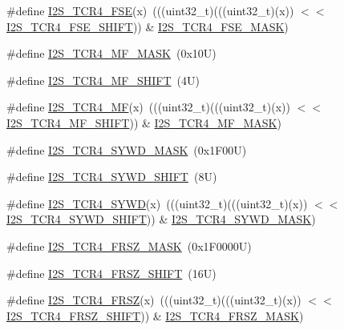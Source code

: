 \begin{DoxyCompactItemize}
\#define \mbox{\hyperlink{group___i2_s___register___masks_ga6307c965fa00d0cca8684a24ed16384c}{I2\+S\+\_\+\+T\+C\+R4\+\_\+\+F\+SE}}(x)~(((uint32\+\_\+t)(((uint32\+\_\+t)(x)) $<$$<$ \mbox{\hyperlink{group___i2_s___register___masks_ga967f80d877a02e10cfe3041c0547c67f}{I2\+S\+\_\+\+T\+C\+R4\+\_\+\+F\+S\+E\+\_\+\+S\+H\+I\+FT}})) \& \mbox{\hyperlink{group___i2_s___register___masks_ga1431c095df0a4ca821052d83ca72ca96}{I2\+S\+\_\+\+T\+C\+R4\+\_\+\+F\+S\+E\+\_\+\+M\+A\+SK}})
\item 
\#define \mbox{\hyperlink{group___i2_s___register___masks_ga3331c691867adbb231a8d1d7ccb4ce94}{I2\+S\+\_\+\+T\+C\+R4\+\_\+\+M\+F\+\_\+\+M\+A\+SK}}~(0x10\+U)
\item 
\#define \mbox{\hyperlink{group___i2_s___register___masks_ga63d02d7aac86c3c6389035e2e3a8a96b}{I2\+S\+\_\+\+T\+C\+R4\+\_\+\+M\+F\+\_\+\+S\+H\+I\+FT}}~(4\+U)
\item 
\#define \mbox{\hyperlink{group___i2_s___register___masks_ga848e9e62f5c0c7c45c68c817eb0a1f0a}{I2\+S\+\_\+\+T\+C\+R4\+\_\+\+MF}}(x)~(((uint32\+\_\+t)(((uint32\+\_\+t)(x)) $<$$<$ \mbox{\hyperlink{group___i2_s___register___masks_ga63d02d7aac86c3c6389035e2e3a8a96b}{I2\+S\+\_\+\+T\+C\+R4\+\_\+\+M\+F\+\_\+\+S\+H\+I\+FT}})) \& \mbox{\hyperlink{group___i2_s___register___masks_ga3331c691867adbb231a8d1d7ccb4ce94}{I2\+S\+\_\+\+T\+C\+R4\+\_\+\+M\+F\+\_\+\+M\+A\+SK}})
\item 
\#define \mbox{\hyperlink{group___i2_s___register___masks_ga239e1c4ba761520bf2d7e0cf65c39d54}{I2\+S\+\_\+\+T\+C\+R4\+\_\+\+S\+Y\+W\+D\+\_\+\+M\+A\+SK}}~(0x1\+F00\+U)
\item 
\#define \mbox{\hyperlink{group___i2_s___register___masks_gadd23753698d7fb9a8948b1db0443fa4f}{I2\+S\+\_\+\+T\+C\+R4\+\_\+\+S\+Y\+W\+D\+\_\+\+S\+H\+I\+FT}}~(8\+U)
\item 
\#define \mbox{\hyperlink{group___i2_s___register___masks_ga3d6d1dade93eeda4a8a6914f60cbb9fc}{I2\+S\+\_\+\+T\+C\+R4\+\_\+\+S\+Y\+WD}}(x)~(((uint32\+\_\+t)(((uint32\+\_\+t)(x)) $<$$<$ \mbox{\hyperlink{group___i2_s___register___masks_gadd23753698d7fb9a8948b1db0443fa4f}{I2\+S\+\_\+\+T\+C\+R4\+\_\+\+S\+Y\+W\+D\+\_\+\+S\+H\+I\+FT}})) \& \mbox{\hyperlink{group___i2_s___register___masks_ga239e1c4ba761520bf2d7e0cf65c39d54}{I2\+S\+\_\+\+T\+C\+R4\+\_\+\+S\+Y\+W\+D\+\_\+\+M\+A\+SK}})
\item 
\#define \mbox{\hyperlink{group___i2_s___register___masks_ga1348cbea02cf3f38b5112c2ed27fafa0}{I2\+S\+\_\+\+T\+C\+R4\+\_\+\+F\+R\+S\+Z\+\_\+\+M\+A\+SK}}~(0x1\+F0000\+U)
\item 
\#define \mbox{\hyperlink{group___i2_s___register___masks_ga7db678baf12c9937bc1f2899876ed142}{I2\+S\+\_\+\+T\+C\+R4\+\_\+\+F\+R\+S\+Z\+\_\+\+S\+H\+I\+FT}}~(16\+U)
\item 
\#define \mbox{\hyperlink{group___i2_s___register___masks_gaadb8adc59ed93d7a11923941424e20e5}{I2\+S\+\_\+\+T\+C\+R4\+\_\+\+F\+R\+SZ}}(x)~(((uint32\+\_\+t)(((uint32\+\_\+t)(x)) $<$$<$ \mbox{\hyperlink{group___i2_s___register___masks_ga7db678baf12c9937bc1f2899876ed142}{I2\+S\+\_\+\+T\+C\+R4\+\_\+\+F\+R\+S\+Z\+\_\+\+S\+H\+I\+FT}})) \& \mbox{\hyperlink{group___i2_s___register___masks_ga1348cbea02cf3f38b5112c2ed27fafa0}{I2\+S\+\_\+\+T\+C\+R4\+\_\+\+F\+R\+S\+Z\+\_\+\+M\+A\+SK}})
\end{DoxyCompactItemize}

